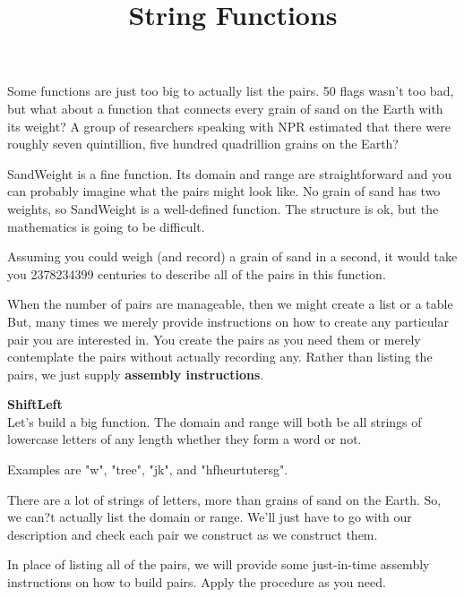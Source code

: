 \documentclass{ximera}
\title{String Functions}
\begin{document}
\begin{abstract}
\end{abstract}

\maketitle






Some functions are just too big to actually list the pairs. 50 flags wasn't too bad, but what about a function that connects every grain of sand on the Earth with its weight? A group of researchers speaking with NPR estimated that there were roughly seven quintillion, five hundred quadrillion grains on the Earth?

SandWeight is a fine function.  Its domain and range are straightforward and you can probably imagine what the pairs might look like.  No grain of sand has two weights, so SandWeight is a well-defined function.  The structure is ok, but the mathematics is going to be difficult.  

Assuming you could weigh (and record) a grain of sand in a second, it would take you 2378234399 centuries to describe all of the pairs in this function.  

When the number of pairs are manageable, then we might create a list or a table  But, many times we merely provide instructions on how to create any particular pair you are interested in. You create the pairs as you need them or merely contemplate the pairs without actually recording any. Rather than listing the pairs, we just supply \textbf{assembly instructions}.

\textbf{ShiftLeft}  \\
Let's build a big function.  The domain and range will both be all strings of lowercase letters of any length whether they form a word or not.

Examples are "w", "tree", "jk", and "hfheurtutersg". 

There are a lot of strings of letters, more than grains of sand on the Earth. So, we can?t actually list the domain or range. We'll just have to go with our description and check each pair we construct as we construct them. 

In place of listing all of the pairs, we will provide some just-in-time assembly instructions on how to build pairs. Apply the procedure as you need.
\end{document}
